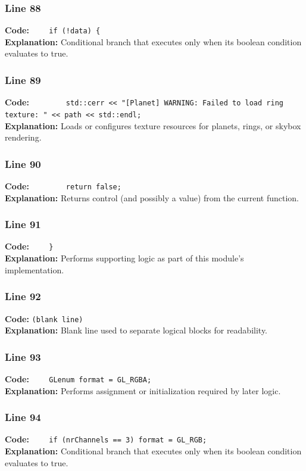 \documentclass[11pt,a4paper]{article}
\begin{document}
\subsubsection*{Line 88}
\textbf{Code:} \verb|    if (!data) {|\\
\textbf{Explanation:} Conditional branch that executes only when its boolean condition evaluates to true.

\subsubsection*{Line 89}
\textbf{Code:} \verb|        std::cerr << "[Planet] WARNING: Failed to load ring texture: " << path << std::endl;|\\
\textbf{Explanation:} Loads or configures texture resources for planets, rings, or skybox rendering.

\subsubsection*{Line 90}
\textbf{Code:} \verb|        return false;|\\
\textbf{Explanation:} Returns control (and possibly a value) from the current function.

\subsubsection*{Line 91}
\textbf{Code:} \verb|    }|\\
\textbf{Explanation:} Performs supporting logic as part of this module's implementation.

\subsubsection*{Line 92}
\textbf{Code:} \texttt{(blank line)}\\
\textbf{Explanation:} Blank line used to separate logical blocks for readability.

\subsubsection*{Line 93}
\textbf{Code:} \verb|    GLenum format = GL_RGBA;|\\
\textbf{Explanation:} Performs assignment or initialization required by later logic.

\subsubsection*{Line 94}
\textbf{Code:} \verb|    if (nrChannels == 3) format = GL_RGB;|\\
\textbf{Explanation:} Conditional branch that executes only when its boolean condition evaluates to true.
\end{document}
